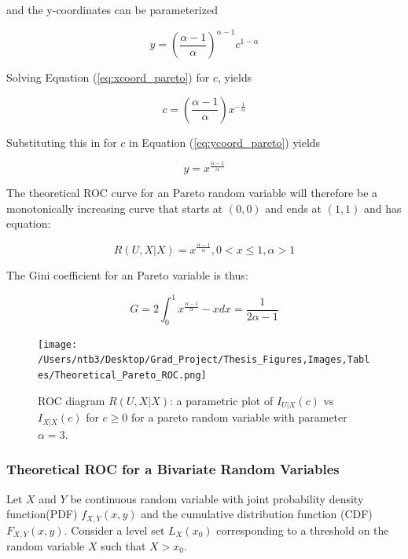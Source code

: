 \documentclass[12pt]{article} %
\theoremstyle{plain}
\begin{document}
and the y-coordinates can be parameterized 

\begin{equation} \label{eq:ycoord_pareto}
	y= \left( \frac{\alpha -1}{\alpha}\right) ^{\alpha -1} c^{1-\alpha}
\end{equation}

Solving Equation (\ref{eq:xcoord_pareto}) for $c$, yields

\begin{equation}
	c= \left( \frac{\alpha -1}{\alpha} \right) x^{-\frac{1}{\alpha}}
\end{equation}

Substituting this in for $c$ in Equation (\ref{eq:ycoord_pareto}) yields

\begin{equation}
	y = x^\frac{\alpha -1}{\alpha}
\end{equation}


The theoretical ROC curve for an Pareto random variable will therefore be a monotonically increasing curve that starts at $(0, 0)$ and ends at $(1, 1)$ and has equation:

\begin{equation}
	R(U,X|X) =  x^\frac{\alpha -1}{\alpha}, 0 < x \leq 1, \alpha >1
\end{equation}


The Gini coefficient for an Pareto variable is thus:

\begin{equation}
	G = 2\int_0^1  x^\frac{\alpha -1}{\alpha} -x dx = \frac{1}{2\alpha -1}
\end{equation}


\begin{figure} [!htbp]
	\centering
	\texttt{[image:  /Users/ntb3/Desktop/Grad\_Project/Thesis\_Figures,Images,Tables/Theoretical\_Pareto\_ROC.png]}
	\caption{ROC diagram $R(U,X|X)$: a parametric plot of $I_{U|X}(c)$ vs $I_{X|X}(c)$ for $c \geq 0$ for a pareto random variable with parameter $\alpha = 3$.
	}
	\label{fig:mass_of_level_sets}
\end{figure}


\pagebreak


\subsubsection{Theoretical ROC for a Bivariate Random Variables}

\indent Let $X$ and $Y$ be continuous random variable with joint probability density function(PDF) $f_{X,Y}(x,y)$
and the cumulative distribution function (CDF) $F_{X,Y}(x,y)$. Consider a level set $L_X(x_0)$ corresponding to a threshold on the random variable $X$ such that $X>x_0$.
\end{document}
